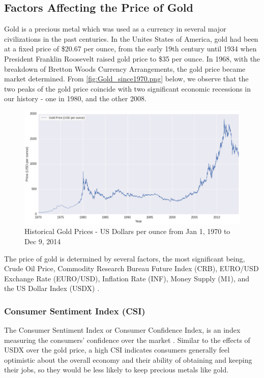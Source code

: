 \documentclass[runningheads]{llncs}
\begin{document}
\subsection{Factors Affecting the Price of Gold}
Gold is a precious metal which was used as a currency in several major civilizations in the past centuries. In the Unites States of America, gold had been at a fixed price of \$20.67 per ounce, from the early 19th century until 1934 when President Franklin Roosevelt raised gold price to \$35 per ounce. In 1968, with the breakdown of Bretton Woods Currency Arrangements, the gold price became market determined. From \autoref{fig:Gold_since1970.png} below, we observe that the two peaks of the gold price coincide with two significant economic recessions in our history - one in 1980, and the other 2008.\\

\begin{figure}
\centering
\includegraphics[width=\textwidth]{Gold_since1970.png}
\caption{Historical Gold Prices - US Dollars per ounce from Jan 1, 1970 to Dec 9, 2014}
\label{fig:Gold_since1970.png}
\end{figure}

\noindent The price of gold is determined by several factors, the most significant being, Crude Oil Price, Commodity Research Bureau Future Index (CRB), EURO/USD Exchange Rate (EURO/USD), Inflation Rate (INF), Money Supply (M1), and the US Dollar Index (USDX) \cite{gold-shafiee}\cite{gold-zhang}\cite{gold-Ismail}. 

\subsubsection{Consumer Sentiment Index (CSI)} 
The Consumer Sentiment Index or Consumer Confidence Index, is an index measuring the consumers' confidence over the market \cite{csi-1}\cite{csi-2}. Similar to the effects of USDX over the gold price, a high CSI indicates consumers generally feel optimistic about the overall economy and their ability of obtaining and keeping their jobs, so they would be less likely to keep precious metals like gold.
\end{document}
